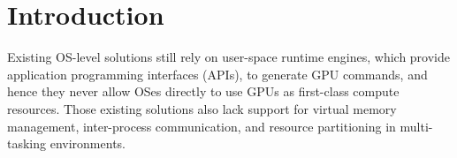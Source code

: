\section{Introduction}
\label{sec:introduction}

Existing OS-level solutions still rely on user-space runtime
engines, which provide application programming interfaces (APIs), to
generate GPU commands, and hence they never allow OSes directly to use
GPUs as first-class compute resources.
Those existing solutions also lack support for virtual memory
management, inter-process communication, and resource partitioning in
multi-tasking environments.
